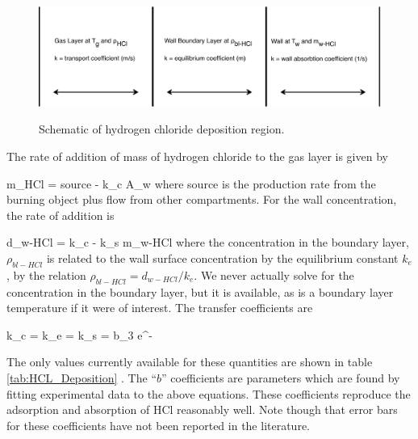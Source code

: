 \begin{figure}[h]
\begin{center}
\includegraphics[width=5.0in]{FIGURES/Theory/HCl_Deposition}\\
\end{center}
\caption{Schematic of hydrogen chloride deposition region.}
 \label{fig:HCl_Deposition}
\end{figure}

The rate of addition of mass of hydrogen chloride to the gas layer is given by

\be {} m_{HCl} = source - k_c  A_w \ee
where source is the production rate from the burning object plus flow from other compartments. For the wall concentration, the rate of addition is

\be {} d_{w-HCl} = k_c  - k_s m_{w-HCl} \ee
where the concentration in the boundary layer, $\rho_{bl-HCl}$  is related to the wall surface concentration by the equilibrium constant $k_e$, by the relation $\rho_{bl-HCl} = d_{w-HCl} / k_e$. We never actually solve for the concentration in the boundary layer, but it is available, as is a boundary layer temperature if it were of interest.  The transfer coefficients are

\be k_c =  \ee
\be k_e =   \ee
\be k_s = b_3 e^{-} \ee

The only values currently available  for these quantities are shown in table \ref{tab:HCL_Deposition} \cite{Galloway:1990}.  The ``$b$'' coefficients are parameters which are found by fitting experimental data to the above equations. These coefficients reproduce the adsorption and absorption of HCl reasonably well.  Note though that error bars for these coefficients have not been reported in the literature.

